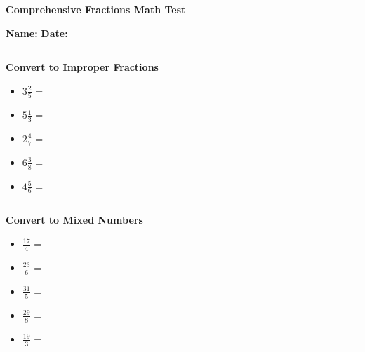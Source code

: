 \documentclass[11pt]{article}
\begin{document}
\begin{center}
\textbf{\Large Comprehensive Fractions Math Test}
\end{center}

\vspace{0.3cm}

\noindent\textbf{Name:} \underline{\hspace{3cm}} \hspace{1cm} \textbf{Date:} \underline{\hspace{2cm}} \hspace{1cm}

\vspace{0.3cm}
\hrule
\vspace{0.3cm}

{\LARGE
\textbf{Convert to Improper Fractions}

\begin{itemize}

\item $3\frac{2}{5}$ = \underline{\hspace{1.5cm}}
\item $5\frac{1}{3}$ = \underline{\hspace{1.5cm}}
\item $2\frac{4}{7}$ = \underline{\hspace{1.5cm}}
\item $6\frac{3}{8}$ = \underline{\hspace{1.5cm}}
\item $4\frac{5}{6}$ = \underline{\hspace{1.5cm}}

\end{itemize}

\vspace{0.3cm}
\hrule
\vspace{0.3cm}

\textbf{Convert to Mixed Numbers}

\begin{itemize}

\item $\frac{17}{4}$ = \underline{\hspace{1.5cm}}
\item $\frac{23}{6}$ = \underline{\hspace{1.5cm}}
\item $\frac{31}{5}$ = \underline{\hspace{1.5cm}}
\item $\frac{29}{8}$ = \underline{\hspace{1.5cm}}
\item $\frac{19}{3}$ = \underline{\hspace{1.5cm}}


\end{itemize}}
\end{document}
